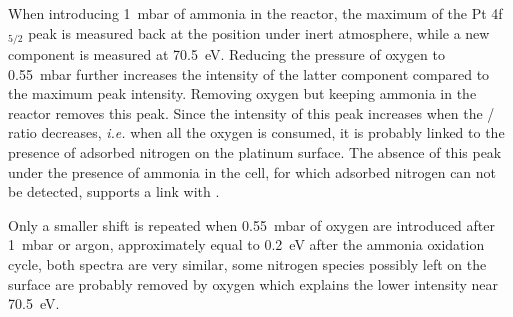 When introducing \qty{1}{\milli\bar} of ammonia in the reactor, the maximum of the Pt 4f$_{5/2}$ peak is measured back at the position under inert atmosphere, while a new component is measured at \qty{70.5}{\eV}.
Reducing the pressure of oxygen to \qty{0.55}{\milli\bar} further increases the intensity of the latter component compared to the maximum peak intensity.
Removing oxygen but keeping ammonia in the reactor removes this peak.
Since the intensity of this peak increases when the / ratio decreases, \textit{i.e.} when all the oxygen is consumed, it is probably linked to the presence of adsorbed nitrogen on the platinum surface.
The absence of this peak under the presence of ammonia in the cell, for which adsorbed nitrogen can not be detected, supports a link with .

Only a smaller shift is repeated when \qty{0.55}{\milli\bar} of oxygen are introduced after \qty{1}{\milli\bar} or argon, approximately equal to \qty{0.2}{\eV} after the ammonia oxidation cycle, both spectra are very similar, some nitrogen species possibly left on the surface are probably removed by oxygen which explains the lower intensity near \qty{70.5}{\eV}.


